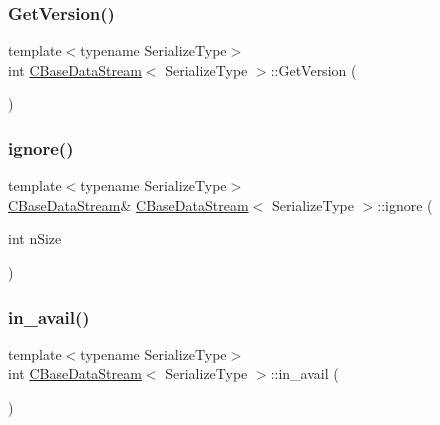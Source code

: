 \mbox{\label{class_c_base_data_stream_a75a64b190fc029cb1938c6d832748057}} 
\subsubsection{\texorpdfstring{Get\+Version()}{GetVersion()}}
{\footnotesize\ttfamily template$<$typename Serialize\+Type$>$ \\
int \mbox{\hyperlink{class_c_base_data_stream}{C\+Base\+Data\+Stream}}$<$ Serialize\+Type $>$\+::Get\+Version (\begin{DoxyParamCaption}{ }\end{DoxyParamCaption})\hspace{0.3cm}{\ttfamily [inline]}}

\mbox{\label{class_c_base_data_stream_aa16c563ce4b72146ac67ea6a3278bc3f}} 
\subsubsection{\texorpdfstring{ignore()}{ignore()}}
{\footnotesize\ttfamily template$<$typename Serialize\+Type$>$ \\
\mbox{\hyperlink{class_c_base_data_stream}{C\+Base\+Data\+Stream}}\& \mbox{\hyperlink{class_c_base_data_stream}{C\+Base\+Data\+Stream}}$<$ Serialize\+Type $>$\+::ignore (\begin{DoxyParamCaption}\item[{int}]{n\+Size }\end{DoxyParamCaption})\hspace{0.3cm}{\ttfamily [inline]}}

\mbox{\label{class_c_base_data_stream_af7c7582f5f38997b0f22b2c44c391f11}} 
\subsubsection{\texorpdfstring{in\+\_\+avail()}{in\_avail()}}
{\footnotesize\ttfamily template$<$typename Serialize\+Type$>$ \\
int \mbox{\hyperlink{class_c_base_data_stream}{C\+Base\+Data\+Stream}}$<$ Serialize\+Type $>$\+::in\+\_\+avail (\begin{DoxyParamCaption}{ }\end{DoxyParamCaption})\hspace{0.3cm}{\ttfamily [inline]}}

